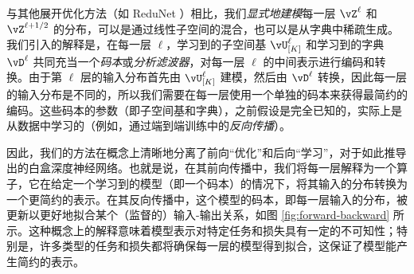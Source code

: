 \documentclass[../../book-main.tex]{subfiles}
\begin{document}

\begin{remark}\label{sub:forward_backward}
    与其他展开优化方法（如 ReduNet \cite{chan2021redunet}）相比，我们\textit{显式地建模}每一层 $\vZ^\ell$ 和 $\vZ^{\ell + 1/2}$ 的分布，可以是通过线性子空间的混合，也可以是从字典中稀疏生成。我们引入的解释是，在每一层 \(\ell\)，学习到的子空间基 \(\vU_{[K]}^{\ell}\) 和学习到的字典 \(\vD^{\ell}\) 共同充当一个\textit{码本}或\textit{分析滤波器}，对每一层 \(\ell\) 的中间表示进行编码和转换。由于第 \(\ell\) 层的输入分布首先由 \(\vU_{[K]}^{\ell}\) 建模，然后由 \(\vD^{\ell}\) 转换，因此每一层的输入分布是不同的，所以我们需要在每一层使用一个单独的码本来获得最简约的编码。这些码本的参数（即子空间基和字典），之前假设是完全已知的，实际上是从数据中学习的（例如，通过端到端训练中的\textit{反向传播}）。

    因此，我们的方法在概念上清晰地分离了前向“优化”和后向“学习”，对于如此推导出的白盒深度神经网络。也就是说，在其前向传播中，我们将每一层解释为一个算子，它在给定一个学习到的模型（即一个码本）的情况下，将其输入的分布转换为一个更简约的表示。在其反向传播中，这个模型的码本，即每一层输入的分布，被更新以更好地拟合某个（监督的）输入-输出关系，如图 \ref{fig:forward-backward} 所示。这种概念上的解释意味着模型表示对特定任务和损失具有一定的不可知性；特别是，许多类型的任务和损失都将确保每一层的模型得到拟合，这保证了模型能产生简约的表示。
\end{remark}





\end{document}
